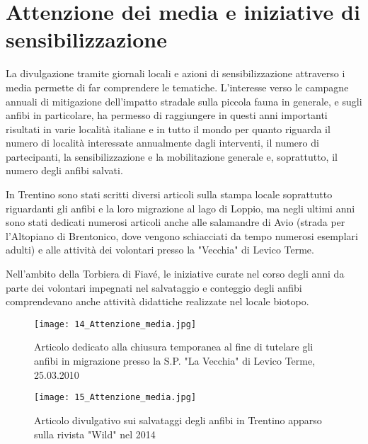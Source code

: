 \documentclass[11pt,a4paper,twoside]{memoir}
\begin{document}
\chapter{Attenzione dei media e iniziative di sensibilizzazione}
La divulgazione tramite giornali locali e azioni di sensibilizzazione attraverso i media permette di far comprendere le tematiche.  L’interesse verso le campagne annuali di mitigazione dell’impatto stradale sulla piccola fauna in generale, e sugli anfibi in particolare, ha permesso di raggiungere in questi anni importanti risultati in varie località italiane e in tutto il mondo per quanto riguarda il numero di località interessate annualmente dagli interventi, il numero di partecipanti, la sensibilizzazione e la mobilitazione generale e, soprattutto, il numero degli anfibi salvati.

In Trentino sono stati scritti diversi articoli sulla stampa locale soprattutto riguardanti gli anfibi e la loro migrazione al lago di Loppio, ma negli ultimi anni sono stati dedicati numerosi articoli anche alle salamandre di Avio (strada per l'Altopiano di Brentonico, dove vengono schiacciati da tempo numerosi esemplari adulti) e alle attività dei volontari presso la "Vecchia" di Levico Terme.

Nell'ambito della Torbiera di Fiavé, le iniziative curate nel corso degli anni da parte dei volontari impegnati nel salvataggio e conteggio degli anfibi comprendevano anche attività didattiche realizzate nel locale biotopo.

\newpage
\vspace*{\fill}
  \begin{figure}[H]
    \label{fig:sottopass2}
    \centering
      \texttt{[image: 14\_Attenzione\_media.jpg]}
    \caption{Articolo dedicato alla chiusura temporanea al fine di tutelare gli anfibi in migrazione presso la S.P. "La Vecchia" di Levico Terme, 25.03.2010}
  \end{figure}
\vspace*{\fill}
  \begin{figure}[H]
    \label{fig:sottopass2}
    \centering
      \texttt{[image: 15\_Attenzione\_media.jpg]}
    \caption{Articolo divulgativo sui salvataggi degli anfibi in Trentino apparso sulla rivista "Wild" nel 2014}
  \end{figure}
\vspace*{\fill}
\end{document}
